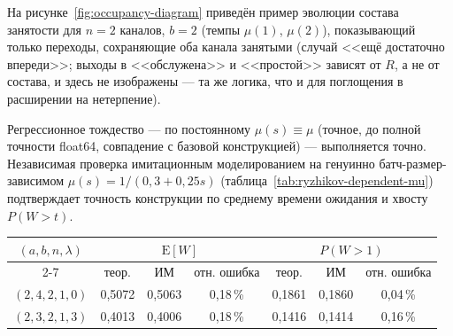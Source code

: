 \documentclass[12pt,a4paper]{article}
\begin{document}
На рисунке~\ref{fig:occupancy-diagram} приведён пример эволюции состава занятости для $n=2$ каналов, $b=2$ (темпы $\mu(1)$, $\mu(2)$), показывающий только переходы, сохраняющие оба канала занятыми (случай <<ещё достаточно впереди>>; выходы в <<обслужена>> и <<простой>> зависят от $R$, а не от состава, и здесь не изображены --- та же логика, что и для поглощения в расширении на нетерпение).

\begin{center}
\label{fig:occupancy-diagram}
\end{center}

Регрессионное тождество --- по постоянному $\mu(s)\equiv\mu$ (точное, до полной точности float64, совпадение с базовой конструкцией) --- выполняется точно. Независимая проверка имитационным моделированием на генуинно батч-размер-зависимом $\mu(s)=1/(0{,}3+0{,}25s)$ (таблица~\ref{tab:ryzhikov-dependent-mu}) подтверждает точность конструкции по среднему времени ожидания и хвосту $P(W>t)$.

\begin{center}
\label{tab:ryzhikov-dependent-mu}
\begin{tabular}{|c|c|c|c|c|c|c|}
\hline
\multirow{2}{*}{$(a,b,n,\lambda)$} & \multicolumn{3}{c|}{$\mathrm{E}[W]$} & \multicolumn{3}{c|}{$P(W>1)$} \\
\cline{2-7}
 & теор. & ИМ & отн. ошибка & теор. & ИМ & отн. ошибка \\
\hline
$(2,4,2,1{,}0)$ & 0,5072 & 0,5063 & 0,18\,\% & 0,1861 & 0,1860 & 0,04\,\% \\
$(2,3,2,1{,}3)$ & 0,4013 & 0,4006 & 0,18\,\% & 0,1416 & 0,1414 & 0,16\,\% \\
\hline
\end{tabular}
\end{center}
\end{document}
